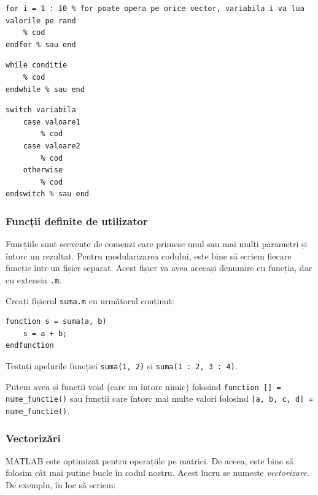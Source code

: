 \documentclass{exam}
\begin{document}
\begin{lstlisting}
for i = 1 : 10 % for poate opera pe orice vector, variabila i va lua valorile pe rand
	% cod
endfor % sau end
\end{lstlisting}

\begin{lstlisting}
while conditie
	% cod
endwhile % sau end
\end{lstlisting}

\begin{lstlisting}
switch variabila
	case valoare1
		% cod
	case valoare2
		% cod
	otherwise
		% cod
endswitch % sau end
\end{lstlisting}

\subsubsection{Funcții definite de utilizator}

\par Funcțiile sunt secvențe de comenzi care primesc unul sau mai mulți
parametri și întorc un rezultat. Pentru modularizarea codului, este bine să
scriem fiecare funcție într-un fișier separat. Acest fișier va avea aceeași
denumire cu funcția, dar cu extensia \verb|.m|.

\par Creați fișierul \verb|suma.m| cu următorul conținut:

\begin{lstlisting}
function s = suma(a, b)
	s = a + b;
endfunction
\end{lstlisting}

\par Testați apelurile funcției \verb|suma(1, 2)| și \verb|suma(1 : 2, 3 : 4)|.

\par Putem avea și funcții void (care nu întorc nimic) folosind
\verb|function [] = nume_functie()| sau funcții care întorc mai multe valori
folosind \verb|[a, b, c, d] = nume_functie()|.

\subsubsection{Vectorizări}

\par MATLAB este optimizat pentru operațiile pe matrici. De aceea, este bine să
folosim cât mai puține bucle în codul nostru. Acest lucru se numește
\textit{vectorizare}. De exemplu, în loc să scriem:
\end{document}

